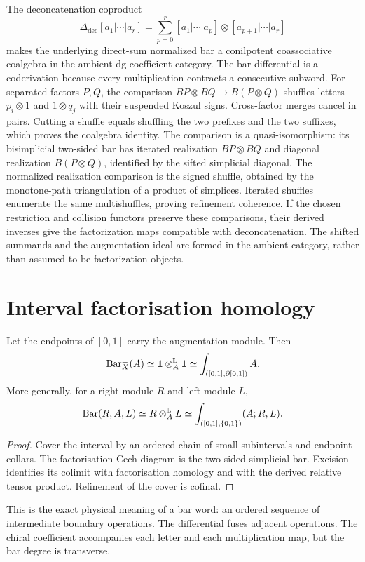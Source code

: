 The deconcatenation coproduct
\[
 \Delta_{\mathrm{dec}}[a_1|\cdots|a_r]
 =\sum_{p=0}^r[a_1|\cdots|a_p]\otimes
 [a_{p+1}|\cdots|a_r]
\]
makes the underlying direct-sum normalized bar a conilpotent coassociative coalgebra in the ambient dg coefficient category.
The bar differential is a coderivation because every multiplication contracts a consecutive subword.
For separated factors $P,Q$, the comparison $BP\otimes BQ\to B(P\otimes Q)$ shuffles
letters $p_i\otimes1$ and $1\otimes q_j$ with their suspended Koszul signs.
Cross-factor merges cancel in pairs. Cutting a shuffle equals shuffling the two prefixes and the two suffixes,
which proves the coalgebra identity. The comparison is a quasi-isomorphism:
its bisimplicial two-sided bar has iterated realization $BP\otimes BQ$
and diagonal realization $B(P\otimes Q)$, identified by the sifted simplicial diagonal.
The normalized realization comparison is the signed shuffle, obtained by the monotone-path triangulation of a product of simplices.
Iterated shuffles enumerate the same multishuffles, proving refinement coherence.
If the chosen restriction and collision functors preserve these comparisons, their derived inverses
give the factorization maps compatible with deconcatenation.
The shifted summands and the augmentation ideal are formed in the ambient category, rather than assumed to be factorization objects.

\section{Interval factorisation homology}
\begin{theorem}\label{thm:bar-interval}
Let the endpoints of \([0,1]\) carry the augmentation module.  Then
\[
 \operatorname{Bar}_X^{\perp}(A)
 \simeq\mathbf 1\otimes_A^{\mathbb L}\mathbf 1
 \simeq\int_{([0,1],\partial[0,1])}A.
\]
More generally, for a right module \(R\) and left module \(L\),
\[
 \operatorname{Bar}(R,A,L)\simeq R\otimes_A^{\mathbb L}L
 \simeq\int_{([0,1],\{0,1\})}(A;R,L).
\]
\end{theorem}
\begin{proof}
Cover the interval by an ordered chain of small subintervals and endpoint collars.  The factorisation Cech diagram is the two-sided simplicial bar.  Excision identifies its colimit with factorisation homology and with the derived relative tensor product.  Refinement of the cover is cofinal.
\end{proof}

This is the exact physical meaning of a bar word: an ordered sequence of intermediate boundary operations.  The differential fuses adjacent operations.  The chiral coefficient accompanies each letter and each multiplication map, but the bar degree is transverse.

